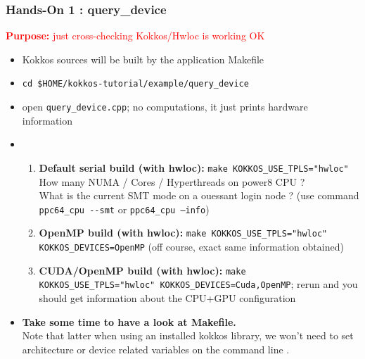 \begin{frame}[fragile=singleslide]
  \frametitle{Hands-On 1 : query\_device}

  {\large\textcolor{red}{\textbf{Purpose:} just cross-checking Kokkos/Hwloc is working OK}}

  \begin{itemize}
  \item Kokkos sources will be built by the application Makefile
  \item \texttt{cd \$HOME/kokkos-tutorial/example/query\_device}
  \item open \texttt{query\_device.cpp}; no computations, it just prints hardware information
  \item 
    \begin{enumerate}
    \item \textbf{Default serial build (with hwloc):} \texttt{make KOKKOS\_USE\_TPLS="hwloc"}\\
      How many NUMA / Cores / Hyperthreads on power8 CPU ?\\
      What is the current SMT mode on a ouessant login node ? (use command \texttt{ppc64\_cpu \--\--smt} or \texttt{ppc64\_cpu --info})
    \item \textbf{OpenMP build (with hwloc):} \texttt{make KOKKOS\_USE\_TPLS="hwloc" KOKKOS\_DEVICES=OpenMP} (off course, exact same information obtained)
    \item \textbf{CUDA/OpenMP build (with hwloc):} \texttt{make KOKKOS\_USE\_TPLS="hwloc" KOKKOS\_DEVICES=Cuda,OpenMP}; rerun and you should get information about the CPU+GPU configuration
    \end{enumerate}
  \item \textbf{Take some time to have a look at Makefile.}\\
    Note that latter when using an installed kokkos library, we won't need to set architecture or device related variables on the command line .
  \end{itemize}

\end{frame}

